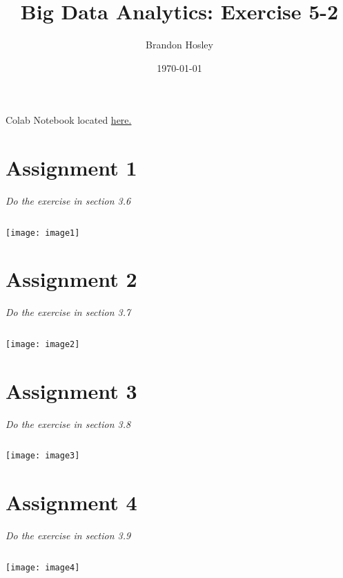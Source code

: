\documentclass[]{article}
\title{Big Data Analytics: Exercise 5-2}
\author{Brandon Hosley}
\date{\today}
\begin{document}
\maketitle

Colab Notebook located
\href{https://colab.research.google.com/drive/1rxCV1SSGTpGZSGphk5AH8Iuuz3TFCNxB?usp=sharing}{here.}

\section*{Assignment 1}
\emph{ Do the exercise in section 3.6 }

\begin{verbatim}

\end{verbatim}
\texttt{[image: image1]}


\section*{Assignment 2}
\emph{ Do the exercise in section 3.7 }

\begin{verbatim}

\end{verbatim}
\texttt{[image: image2]} 


\section*{Assignment 3}
\emph{ Do the exercise in section 3.8 }

\begin{verbatim}

\end{verbatim}
\texttt{[image: image3]} 


\section*{Assignment 4}
\emph{ Do the exercise in section 3.9 }

\begin{verbatim}

\end{verbatim}
\texttt{[image: image4]} %
\end{document}
